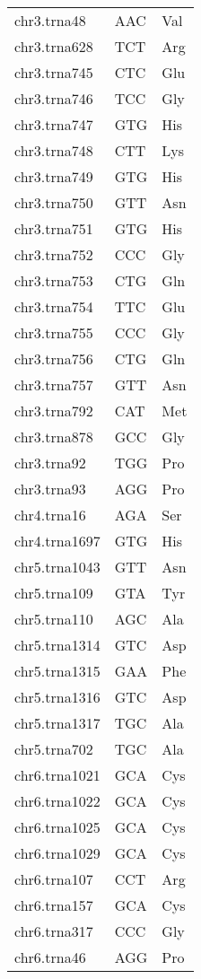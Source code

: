 \begin{longtable}{@{}l>{\collectcell\anticodon}l<{\endcollectcell}l@{}}
    chr3.trna48 & AAC & Val \\
    chr3.trna628 & TCT & Arg \\
    chr3.trna745 & CTC & Glu \\
    chr3.trna746 & TCC & Gly \\
    chr3.trna747 & GTG & His \\
    chr3.trna748 & CTT & Lys \\
    chr3.trna749 & GTG & His \\
    chr3.trna750 & GTT & Asn \\
    chr3.trna751 & GTG & His \\
    chr3.trna752 & CCC & Gly \\
    chr3.trna753 & CTG & Gln \\
    chr3.trna754 & TTC & Glu \\
    chr3.trna755 & CCC & Gly \\
    chr3.trna756 & CTG & Gln \\
    chr3.trna757 & GTT & Asn \\
    chr3.trna792 & CAT & Met \\
    chr3.trna878 & GCC & Gly \\
    chr3.trna92 & TGG & Pro \\
    chr3.trna93 & AGG & Pro \\
    chr4.trna16 & AGA & Ser \\
    chr4.trna1697 & GTG & His \\
    chr5.trna1043 & GTT & Asn \\
    chr5.trna109 & GTA & Tyr \\
    chr5.trna110 & AGC & Ala \\
    chr5.trna1314 & GTC & Asp \\
    chr5.trna1315 & GAA & Phe \\
    chr5.trna1316 & GTC & Asp \\
    chr5.trna1317 & TGC & Ala \\
    chr5.trna702 & TGC & Ala \\
    chr6.trna1021 & GCA & Cys \\
    chr6.trna1022 & GCA & Cys \\
    chr6.trna1025 & GCA & Cys \\
    chr6.trna1029 & GCA & Cys \\
    chr6.trna107 & CCT & Arg \\
    chr6.trna157 & GCA & Cys \\
    chr6.trna317 & CCC & Gly \\
    chr6.trna46 & AGG & Pro \\

\end{longtable}
